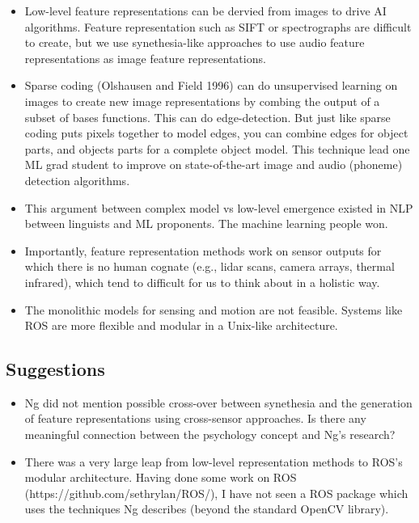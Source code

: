 \documentclass[9pt,letterpaper]{article}
\begin{document}
\begin{itemize}
\begin{itemize}
\end{itemize}
\item Low-level feature representations can be dervied from images to drive AI algorithms. Feature representation such as SIFT or spectrographs are difficult to create, but we use synethesia-like approaches to use audio feature representations as image feature representations.
\item Sparse coding (Olshausen and Field 1996) can do unsupervised learning on images to create new image representations by combing the output of a subset of bases functions. This can do edge-detection. But just like sparse coding puts pixels together to model edges, you can combine edges for object parts, and objects parts for a complete object model. This technique lead one ML grad student to improve on state-of-the-art image and audio (phoneme) detection algorithms.
\item This argument between complex model vs low-level emergence existed in NLP between linguists and ML proponents. The machine learning people won.
\item Importantly, feature representation methods work on sensor outputs for which there is no human cognate (e.g., lidar scans, camera arrays, thermal infrared), which tend to difficult for us to think about in a holistic way.
\item The monolithic models for sensing and motion are not feasible. Systems like ROS are more flexible and modular in a Unix-like architecture.
\end{itemize}


\subsection*{Suggestions}

\begin{itemize}
\addtolength{\itemsep}{-0.5\baselineskip}
\item Ng did not mention possible cross-over between synethesia and the generation of feature representations using cross-sensor approaches. Is there any meaningful connection between the psychology concept and Ng's research?
\item There was a very large leap from low-level representation methods to ROS's modular architecture. Having done some work on ROS (https://github.com/sethrylan/ROS/), I have not seen a ROS package which uses the techniques Ng describes (beyond the standard OpenCV library).
\end{itemize}


\begin{singlespace}
\begin{footnotesize}

\end{footnotesize}
\end{singlespace}
\end{document}
